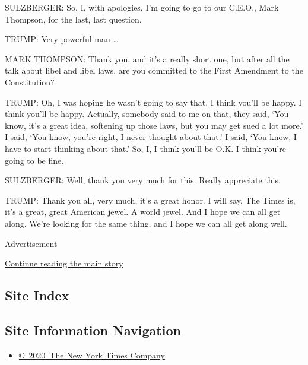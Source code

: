 SULZBERGER: So, I, with apologies, I'm going to go to our C.E.O., Mark
Thompson, for the last, last question.

TRUMP: Very powerful man \ldots{}

MARK THOMPSON: Thank you, and it's a really short one, but after all the
talk about libel and libel laws, are you committed to the First
Amendment to the Constitution?

TRUMP: Oh, I was hoping he wasn't going to say that. I think you'll be
happy. I think you'll be happy. Actually, somebody said to me on that,
they said, `You know, it's a great idea, softening up those laws, but
you may get sued a lot more.' I said, `You know, you're right, I never
thought about that.' I said, `You know, I have to start thinking about
that.' So, I, I think you'll be O.K. I think you're going to be fine.

SULZBERGER: Well, thank you very much for this. Really appreciate this.

TRUMP: Thank you all, very much, it's a great honor. I will say, The
Times is, it's a great, great American jewel. A world jewel. And I hope
we can all get along. We're looking for the same thing, and I hope we
can all get along well.

Advertisement

\protect\hyperlink{after-bottom}{Continue reading the main story}

\hypertarget{site-index}{%
\subsection{Site Index}\label{site-index}}

\hypertarget{site-information-navigation}{%
\subsection{Site Information
Navigation}\label{site-information-navigation}}

\begin{itemize}
\tightlist
\item
  \href{https://help.nytimes.com/hc/en-us/articles/115014792127-Copyright-notice}{©~2020~The
  New York Times Company}
\end{itemize}


